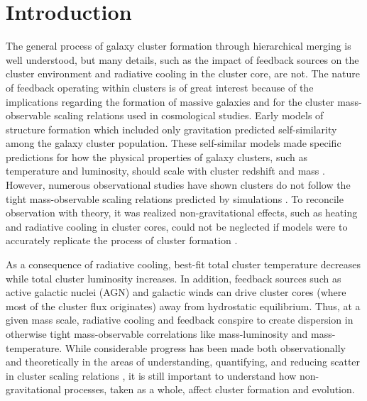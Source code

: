 \documentclass{emulateapj}
\begin{document}


\section{Introduction}
\label{sec:intro}

The general process of galaxy cluster formation through hierarchical
merging is well understood, but many details, such as the impact of
feedback sources on the cluster environment and radiative cooling in
the cluster core, are not. The nature of feedback operating within
clusters is of great interest because of the implications regarding
the formation of massive galaxies and for the cluster mass-observable
scaling relations used in cosmological studies. Early models of
structure formation which included only gravitation predicted
self-similarity among the galaxy cluster population. These
self-similar models made specific predictions for how the physical
properties of galaxy clusters, such as temperature and luminosity,
should scale with cluster redshift and mass \citep{kaiser86, kaiser91,
1991ApJ...383...95E, nfw1, nfw2, 1996ApJ...469..494E,
1997MNRAS.292..289E, 1997ApJ...480...36T, 1998ApJ...503..569E,
1998ApJ...495...80B}. However, numerous observational studies have
shown clusters do not follow the tight mass-observable scaling
relations predicted by simulations \citep{edge91, 1998MNRAS.297L..57A,
1998ApJ...504...27M, 1999MNRAS.305..631A, 1999ApJ...520...78H,
2000ApJ...536...73N, 2001A&A...368..749F}. To reconcile observation
with theory, it was realized non-gravitational effects, such as
heating and radiative cooling in cluster cores, could not be neglected
if models were to accurately replicate the process of cluster
formation \citep[\eg][]{kaiser91, 1991ApJ...383...95E,
2000ApJ...532...17L, 2002MNRAS.336..409B}.

As a consequence of radiative cooling, best-fit total cluster
temperature decreases while total cluster luminosity increases. In
addition, feedback sources such as active galactic nuclei (AGN) and
galactic winds can drive cluster cores (where most of the cluster flux
originates) away from hydrostatic equilibrium. Thus, at a given mass
scale, radiative cooling and feedback conspire to create dispersion in
otherwise tight mass-observable correlations like mass-luminosity and
mass-temperature. While considerable progress has been made both
observationally and theoretically in the areas of understanding,
quantifying, and reducing scatter in cluster scaling relations
\citep{1996ApJ...458...27B, 2005ApJ...624..606J, kravtsov06, nagai07,
  VV08}, it is still important to understand how non-gravitational
processes, taken as a whole, affect cluster formation and evolution.
\end{document}
